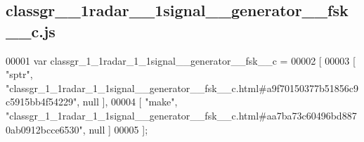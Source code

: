\subsection{classgr\+\_\+\_\+1radar\+\_\+\_\+1signal\+\_\+\+\_\+generator\+\_\+\+\_\+fsk\+\_\+\+\_\+c.\+js}
\label{classgr__1__1radar__1__1signal____generator____fsk____c_8js_source}

\begin{DoxyCode}
00001 var classgr_1_1radar_1_1signal__generator__fsk__c =
00002 [
00003     [ \textcolor{stringliteral}{"sptr"}, \textcolor{stringliteral}{"classgr\_1\_1radar\_1\_1signal\_\_generator\_\_fsk\_\_c.html#a9f70150377b51856c9c5915bb4f54229"}, null 
      ],
00004     [ \textcolor{stringliteral}{"make"}, \textcolor{stringliteral}{"classgr\_1\_1radar\_1\_1signal\_\_generator\_\_fsk\_\_c.html#aa7ba73c60496bd8870ab0912bcce6530"}, null 
      ]
00005 ];
\end{DoxyCode}
